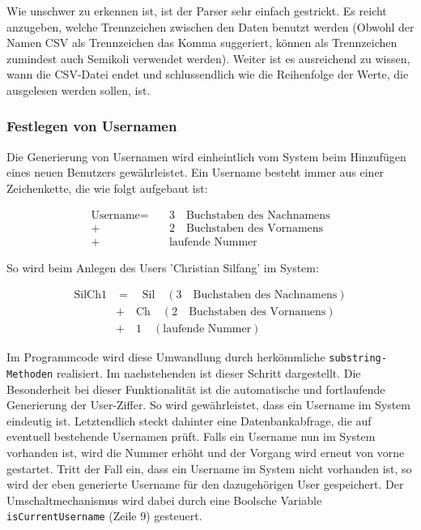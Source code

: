Wie unschwer zu erkennen ist, ist der Parser sehr einfach gestrickt. Es reicht anzugeben, welche Trennzeichen zwischen den Daten benutzt werden (Obwohl der Namen CSV als Trennzeichen das Komma suggeriert, können als Trennzeichen zumindest auch Semikoli verwendet werden).
Weiter ist es ausreichend zu wissen, wann die CSV-Datei endet und schlussendlich wie die Reihenfolge der Werte, die ausgelesen werden sollen, ist.

	

\subsubsection{Festlegen von Usernamen}

Die Generierung von Usernamen wird einheintlich vom System beim Hinzufügen eines neuen Benutzers gewährleistet.
Ein Username besteht immer aus einer Zeichenkette, die wie folgt aufgebaut ist:

\[
\begin{split}
  \text{Username} =\quad & 3\quad \text{Buchstaben des Nachnamens}\\ 
  +\quad & 2 \quad \text{Buchstaben des Vornamens}\\ 
  +\quad & \text{laufende Nummer}
\end{split}
\]

So wird beim Anlegen des Users 'Christian Silfang' im System:

\[
\begin{split}
  \text{SilCh1} &= \quad \text{Sil} \quad (3 \quad \text{Buchstaben des Nachnamens})\\ 
		&+ \quad \text{Ch} \quad (2 \quad \text{Buchstaben des Vornamens})\\ 
		&+ \quad 1 \quad (\text{laufende Nummer})
\end{split}
\]

Im Programmcode wird diese Umwandlung durch herkömmliche \texttt{substring-Methoden} realisiert.
Im nachstehenden  ist dieser Schritt dargestellt. Die Besonderheit bei dieser Funktionalität ist die automatische und fortlaufende Generierung der User-Ziffer. So wird gewährleistet, dass ein Username im System eindeutig ist. Letztendlich steckt dahinter eine Datenbankabfrage, die auf eventuell bestehende Usernamen prüft.
Falls ein Username nun im System vorhanden ist, wird die Nummer erhöht und der Vorgang wird erneut von vorne gestartet. Tritt der Fall ein, dass ein Username im System nicht vorhanden ist, so wird der eben generierte Username für den dazugehörigen User gespeichert. Der Umschaltmechanismus wird dabei durch eine Boolsche Variable \texttt{isCurrentUsername} (Zeile 9) gesteuert.

